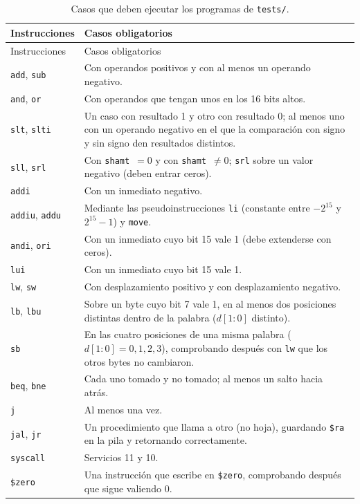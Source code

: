 \documentclass[11pt,a4paper]{article}
\newcommand{\sig}[1]{\texttt{#1}}
\begin{document}
\begin{longtable}{@{}p{3.4cm}p{12.1cm}@{}}
\caption{Casos que deben ejecutar los programas de \sig{tests/}.}\label{tab:casos}\\
\toprule
Instrucciones & Casos obligatorios \\
\midrule
\endfirsthead
\toprule
Instrucciones & Casos obligatorios \\
\midrule
\endhead
\sig{add}, \sig{sub} & Con operandos positivos y con al menos un operando negativo. \\
\sig{and}, \sig{or} & Con operandos que tengan unos en los 16 bits altos. \\
\sig{slt}, \sig{slti} & Un caso con resultado 1 y otro con resultado 0; al menos uno con un operando negativo en el que la comparación con signo y sin signo den resultados distintos. \\
\sig{sll}, \sig{srl} & Con \sig{shamt}~$=0$ y con \sig{shamt}~$\neq 0$; \sig{srl} sobre un valor negativo (deben entrar ceros). \\
\sig{addi} & Con un inmediato negativo. \\
\sig{addiu}, \sig{addu} & Mediante las pseudoinstrucciones \sig{li} (constante entre $-2^{15}$ y $2^{15}-1$) y \sig{move}. \\
\sig{andi}, \sig{ori} & Con un inmediato cuyo bit 15 vale 1 (debe extenderse con ceros). \\
\sig{lui} & Con un inmediato cuyo bit 15 vale 1. \\
\sig{lw}, \sig{sw} & Con desplazamiento positivo y con desplazamiento negativo. \\
\sig{lb}, \sig{lbu} & Sobre un byte cuyo bit 7 vale 1, en al menos dos posiciones distintas dentro de la palabra ($d[1{:}0]$ distinto). \\
\sig{sb} & En las cuatro posiciones de una misma palabra ($d[1{:}0] = 0, 1, 2, 3$), comprobando después con \sig{lw} que los otros bytes no cambiaron. \\
\sig{beq}, \sig{bne} & Cada uno tomado y no tomado; al menos un salto hacia atrás. \\
\sig{j} & Al menos una vez. \\
\sig{jal}, \sig{jr} & Un procedimiento que llama a otro (no hoja), guardando \sig{\$ra} en la pila y retornando correctamente. \\
\sig{syscall} & Servicios 11 y 10. \\
\sig{\$zero} & Una instrucción que escribe en \sig{\$zero}, comprobando después que sigue valiendo 0. \\
\bottomrule
\end{longtable}
\end{document}
